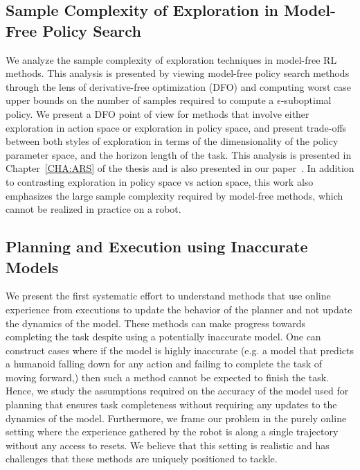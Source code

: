 
\subsection{Sample Complexity of Exploration in Model-Free Policy
  Search}
\label{sec:sample-compl-expl}
We analyze the sample complexity of exploration techniques in
  model-free RL methods. This analysis is presented by viewing model-free policy
  search methods through the lens of derivative-free optimization (DFO)
  and computing worst case upper bounds on the number of samples
  required to compute a $\epsilon$-suboptimal policy. We present a DFO
  point of view for methods that involve either exploration in action
  space or exploration in policy space, and present trade-offs between
  both styles of exploration in terms of the dimensionality of the
  policy parameter space, and the horizon length of the task. This
  analysis is presented in Chapter~\ref{CHA:ARS} of the
  thesis and is also presented in our paper~\cite{aistats19}. In addition
  to contrasting exploration in policy space vs action space, this
  work also emphasizes the large sample complexity required by
  model-free methods, which cannot be realized in practice on a robot.
  
\subsection{Planning and Execution using Inaccurate Models}
\label{sec:plann-exec-using}
  We present the first systematic effort to understand methods
  that use online experience from executions to update the behavior of
  the planner and not update the dynamics of the model. These
  methods can make progress towards completing the task despite using
  a potentially inaccurate model. One can construct cases where if the
  model is highly inaccurate (e.g. a model that predicts a humanoid
  falling down for any action and failing to complete the task of
  moving forward,) then such a method cannot be expected to finish the
  task. Hence, we study the assumptions required on the accuracy of
  the model used for planning that ensures task completeness without
  requiring any updates to the dynamics of the model. Furthermore, we
  frame our problem in the purely online setting where the experience
  gathered by the robot is along a single trajectory without any
  access to resets. We believe that this setting is realistic and has
  challenges that these methods are uniquely positioned to tackle.

